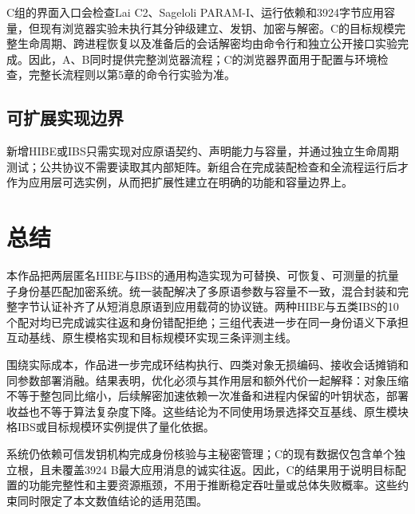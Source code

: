 \documentclass[UTF8,a4paper,12pt,oneside,openany,fontset=fandol]{ctexrep}
\begin{document}
C组的界面入口会检查Lai C2、Sageloli PARAM-I、运行依赖和3924字节应用容量，但现有浏览器实验未执行其分钟级建立、发钥、加密与解密。C的目标规模完整生命周期、跨进程恢复以及准备后的会话解密均由命令行和独立公开接口实验完成。因此，A、B同时提供完整浏览器流程；C的浏览器界面用于配置与环境检查，完整长流程则以第5章的命令行实验为准。

\section{可扩展实现边界}
新增HIBE或IBS只需实现对应原语契约、声明能力与容量，并通过独立生命周期测试；公共协议不需要读取其内部矩阵。新组合在完成装配检查和全流程运行后才作为应用层可选实例，从而把扩展性建立在明确的功能和容量边界上。

\chapter{总结}
本作品把两层匿名HIBE与IBS的通用构造实现为可替换、可恢复、可测量的抗量子身份基匹配加密系统。统一装配解决了多原语参数与容量不一致，混合封装和完整字节认证补齐了从短消息原语到应用载荷的协议链。两种HIBE与五类IBS的10个配对均已完成诚实往返和身份错配拒绝；三组代表进一步在同一身份语义下承担互动基线、原生模格实现和目标规模环实现三条评测主线。

围绕实际成本，作品进一步完成环结构执行、四类对象无损编码、接收会话摊销和同参数部署消融。结果表明，优化必须与其作用层和额外代价一起解释：对象压缩不等于整包同比缩小，后续解密加速依赖一次准备和进程内保留的叶钥状态，部署收益也不等于算法复杂度下降。这些结论为不同使用场景选择交互基线、原生模块格IBS或目标规模环实例提供了量化依据。

系统仍依赖可信发钥机构完成身份核验与主秘密管理；C的现有数据仅包含单个独立根，且未覆盖3924 B最大应用消息的诚实往返。因此，C的结果用于说明目标配置的功能完整性和主要资源瓶颈，不用于推断稳定吞吐量或总体失败概率。这些约束同时限定了本文数值结论的适用范围。
\end{document}
